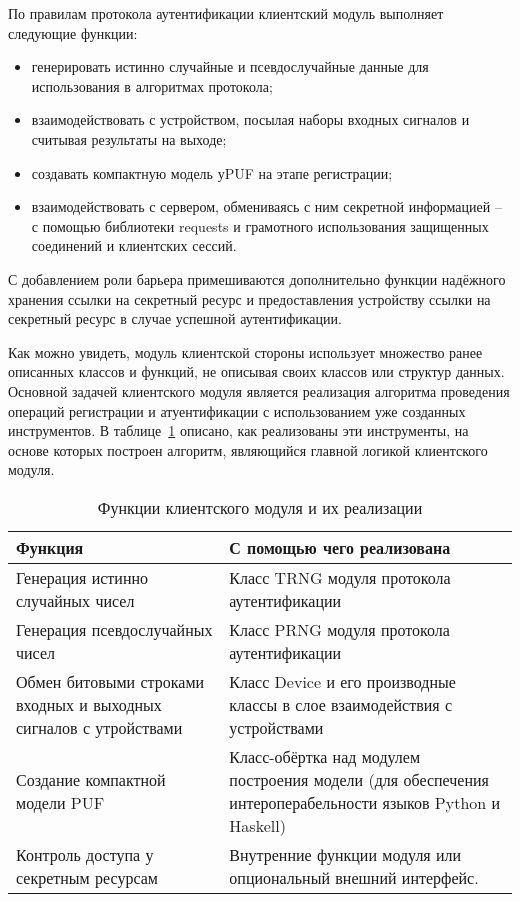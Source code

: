 По правилам протокола аутентификации клиентский модуль выполняет следующие функции:
\begin{itemize}
  \item генерировать истинно случайные и псевдослучайные данные для использования в алгоритмах протокола;
  \item взаимодействовать с устройством, посылая наборы входных сигналов и считывая результаты на выходе;
  \item создавать компактную модель уPUF на этапе регистрации;
  \item взаимодействовать с сервером, обмениваясь с ним секретной информацией -- с помощью библиотеки requests и грамотного использования защищенных соединений  и клиентских сессий.
\end{itemize}

С добавлением роли барьера примешиваются дополнительно функции надёжного хранения ссылки на секретный ресурс и предоставления устройству ссылки на секретный ресурс  в случае успешной аутентификации.

Как можно увидеть, модуль клиентской стороны использует множество ранее описанных классов и функций, не описывая своих классов или структур данных. Основной задачей клиентского модуля является реализация алгоритма проведения операций регистрации и атуентификации с использованием уже созданных инструментов. В таблице~\ref{table:architecture:client_funcs} описано, как реализованы эти инструменты, на основе которых построен алгоритм, являющийся главной логикой клиентского модуля.

\begin{table}[ht]
  \caption{Функции клиентского модуля и их реализации}
  \label{table:architecture:client_funcs}
  \begin{tabular}{| >{\raggedright}m{}
                  | >{\raggedright\arraybackslash}m{}|}
   \hline
   Функция & С помощью чего реализована
   \\ \hline
   Генерация истинно случайных чисел & Класс TRNG модуля протокола аутентификации
   \\ \hline
   Генерация псевдослучайных чисел & Класс PRNG модуля протокола аутентификации
   \\ \hline
   Обмен битовыми строками входных и выходных сигналов с утройствами & Класс Device и его производные классы в слое взаимодействия с устройствами
   \\ \hline
   Создание компактной модели PUF & Класс-обёртка над модулем построения модели (для обеспечения интероперабельности языков Python и Haskell)
   \\ \hline
   Контроль доступа у секретным ресурсам & Внутренние функции модуля или опциональный внешний интерфейс.
   \\ \hline
  \end{tabular}
\end{table}

